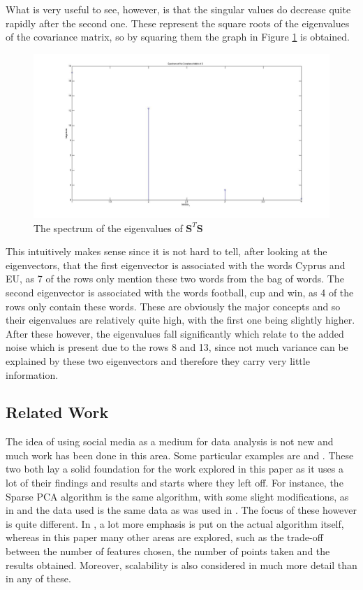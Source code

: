 \documentclass[11pt,a4paper]{article}
\begin{document}
What is very useful to see, however, is that the singular values do decrease quite rapidly after the second one. These represent the square roots of the eigenvalues of the covariance matrix, so by squaring them the graph in Figure \ref{spectrum} is obtained.

\begin{figure}[H]
\centering
\includegraphics[scale=0.3]{Spectrum_Eigenvalues.jpg}
\caption{The spectrum of the eigenvalues of $\mathbf{S}^T\mathbf{S}$}
\label{spectrum}
\end{figure}

This intuitively makes sense since it is not hard to tell, after looking at the eigenvectors, that the first eigenvector is associated with the words Cyprus and EU, as 7 of the rows only mention these two words from the bag of words. The second eigenvector is associated with the words football, cup and win, as 4 of the rows only contain these words. These are obviously the major concepts and so their eigenvalues are relatively quite high, with the first one being slightly higher. After these however, the eigenvalues fall significantly which relate to the added noise which is present due to the rows 8 and 13, since not much variance can be explained by these two eigenvectors and therefore they carry very little information. 


\subsection{Related Work}
The idea of using social media as a medium for data analysis is not new and much work has been done in this area. Some particular examples are \cite{dimakis} and \cite{microblogs}. These two both lay a solid foundation for the work explored in this paper as it uses a lot of their findings and results and starts where they left off. For instance, the Sparse PCA algorithm is the same algorithm, with some slight modifications, as in \cite{dimakis} and the data used is the same data as was used in \cite{microblogs}. The focus of these however is quite different. In \cite{dimakis}, a lot more emphasis is put on the actual algorithm itself, whereas in this paper many other areas are explored, such as the trade-off between the number of features chosen, the number of points taken and the results obtained. Moreover, scalability is also considered in much more detail than in any of these. 
\end{document}
